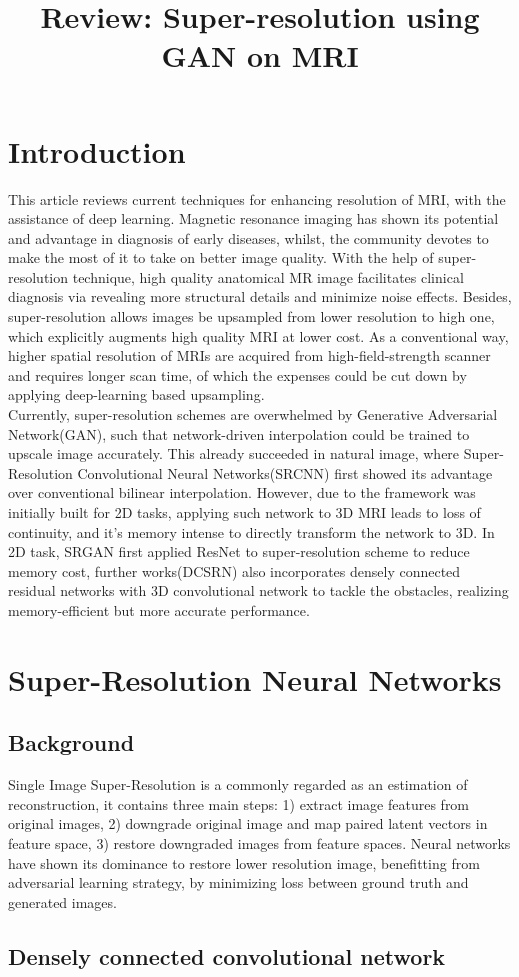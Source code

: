 \documentclass{article}
\begin{document}
\title{Review: Super-resolution using GAN on MRI}
\maketitle
\section{Introduction}
This article reviews current techniques for enhancing resolution of MRI, with the assistance of deep learning. Magnetic resonance imaging has shown its potential and advantage in diagnosis of early diseases, whilst, the community devotes to make the most of it to take on better image quality. With the help of super-resolution technique, high quality anatomical MR image facilitates clinical diagnosis via revealing more structural details and minimize noise effects. Besides, super-resolution allows images be upsampled from lower resolution to high one, which explicitly augments high quality MRI at lower cost. As a conventional way, higher spatial resolution of MRIs are acquired from high-field-strength scanner and requires longer scan time,  of which the expenses could be cut down by applying deep-learning based upsampling. \\

Currently, super-resolution schemes are overwhelmed by Generative Adversarial Network(GAN), such that network-driven interpolation could be trained to upscale image accurately. This already succeeded in natural image, where Super-
Resolution Convolutional Neural Networks(SRCNN) first showed its advantage over conventional bilinear interpolation. However, due to the framework was initially built for 2D tasks, applying such network to 3D MRI leads to loss of continuity, and it's memory intense to directly transform the network to 3D. In 2D task, SRGAN first applied ResNet to super-resolution scheme to reduce memory cost, further works(DCSRN) also incorporates densely connected residual networks with 3D convolutional network to tackle the obstacles, realizing memory-efficient but more accurate performance.  


\section{Super-Resolution Neural Networks}
\subsection{Background}
Single Image Super-Resolution is a commonly regarded as an estimation of reconstruction, it contains three main steps: 1) extract image features from original images, 2) downgrade original image and map paired latent vectors in feature space, 3) restore downgraded images from feature spaces. Neural networks have shown its dominance to restore lower resolution image, benefitting from adversarial learning strategy, by minimizing loss between ground truth and generated images. \\
\subsection{Densely connected convolutional network}
\end{document}

